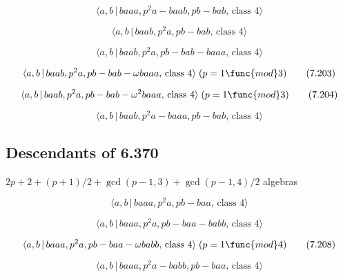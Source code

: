 \documentclass[10pt]{article}
\begin{document}
\begin{equation}
\langle a,b\,|\,baaa,p^2a-baab,pb-bab,\,\text{class }4\rangle  \tag{7.200}
\end{equation}

\begin{equation}
\langle a,b\,|\,baab,p^2a,pb-bab,\,\text{class }4\rangle  \tag{7.201}
\end{equation}

\begin{equation}
\langle a,b\,|\,baab,p^2a,pb-bab-baaa,\,\text{class }4\rangle  \tag{7.202}
\end{equation}

\begin{equation}
\langle a,b\,|\,baab,p^{2}a,pb-bab-\omega baaa,\,\text{class }4\rangle \;(p=1%
\func{mod}3)  \tag{7.203}
\end{equation}

\begin{equation}
\langle a,b\,|\,baab,p^{2}a,pb-bab-\omega ^{2}baaa,\,\text{class }4\rangle
\;(p=1\func{mod}3)  \tag{7.204}
\end{equation}

\begin{equation}
\langle a,b\,|\,baab,p^2a-baaa,pb-bab,\,\text{class }4\rangle  \tag{7.205}
\end{equation}

\subsection{Descendants of 6.370}

$2p+2+(p+1)/2+\gcd (p-1,3)+\gcd (p-1,4)/2$ algebras

\begin{equation}
\langle a,b\,|\,baaa,p^2a,pb-baa,\,\text{class }4\rangle  \tag{7.206}
\end{equation}

\begin{equation}
\langle a,b\,|\,baaa,p^2a,pb-baa-babb,\,\text{class }4\rangle  \tag{7.207}
\end{equation}

\begin{equation}
\langle a,b\,|\,baaa,p^{2}a,pb-baa-\omega babb,\,\text{class }4\rangle \;(p=1%
\func{mod}4)  \tag{7.208}
\end{equation}

\begin{equation}
\langle a,b\,|\,baaa,p^2a-babb,pb-baa,\,\text{class }4\rangle  \tag{7.209}
\end{equation}
\end{document}
